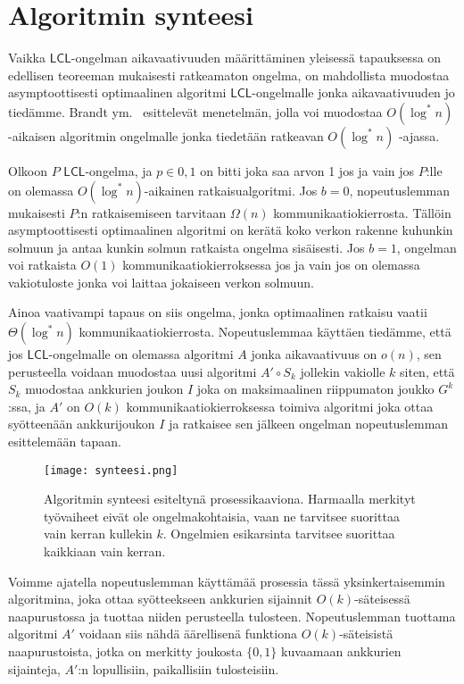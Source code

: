 \documentclass[12pt,finnish]{tktltiki2}
\theoremstyle{definition}
\theoremstyle{remark}
\newcommand*{\lcl}{\ensuremath{\mathsf{LCL}}}
\begin{document}
\section{Algoritmin synteesi}
Vaikka \lcl -ongelman aikavaativuuden määrittäminen yleisessä tapauksessa on edellisen teoreeman mukaisesti ratkeamaton ongelma, on mahdollista muodostaa asymptoottisesti optimaalinen algoritmi \lcl -ongelmalle jonka aikavaativuuden jo tiedämme. Brandt ym.~\cite{brandt} esittelevät menetelmän, jolla voi muodostaa $O(\log^* n)$ -aikaisen algoritmin ongelmalle jonka tiedetään ratkeavan $O(\log^* n)$ -ajassa.

Olkoon $P$ \lcl -ongelma, ja $p \in {0, 1}$ on bitti joka saa arvon 1 jos ja vain jos $P$:lle on olemassa $O(\log^* n)$-aikainen ratkaisualgoritmi. Jos $b = 0$, nopeutuslemman mukaisesti $P$:n ratkaisemiseen tarvitaan $\Omega(n)$ kommunikaatiokierrosta. Tällöin asymptoottisesti optimaalinen algoritmi on kerätä koko verkon rakenne kuhunkin solmuun ja antaa kunkin solmun ratkaista ongelma sisäisesti. Jos $b = 1$, ongelman voi ratkaista $O(1)$ kommunikaatiokierroksessa jos ja vain jos on olemassa vakiotuloste jonka voi laittaa jokaiseen verkon solmuun.

Ainoa vaativampi tapaus on siis ongelma, jonka optimaalinen ratkaisu vaatii $\Theta(\log^* n)$ kommunikaatiokierrosta. Nopeutuslemmaa käyttäen tiedämme, että jos \lcl -ongelmalle on olemassa algoritmi $A$ jonka aikavaativuus on $o(n)$, sen perusteella voidaan muodostaa uusi algoritmi $A' \circ S_k$ jollekin vakiolle $k$ siten, että $S_k$ muodostaa ankkurien joukon $I$ joka on maksimaalinen riippumaton joukko $G^k$:ssa, ja $A'$ on $O(k)$ kommunikaatiokierroksessa toimiva algoritmi joka ottaa syötteenään ankkurijoukon $I$ ja ratkaisee sen jälkeen ongelman nopeutuslemman esittelemään tapaan.


\begin{figure}
  \texttt{[image: synteesi.png]}
  \caption{Algoritmin synteesi esiteltynä prosessikaaviona. Harmaalla merkityt työvaiheet eivät ole ongelmakohtaisia, vaan ne tarvitsee suorittaa vain kerran kullekin $k$. Ongelmien esikarsinta tarvitsee suorittaa kaikkiaan vain kerran.}
\end{figure}

Voimme ajatella nopeutuslemman käyttämää prosessia tässä yksinkertaisemmin algoritmina, joka ottaa syötteekseen ankkurien sijainnit $O(k)$-säteisessä naapurustossa ja tuottaa niiden perusteella tulosteen. Nopeutuslemman tuottama algoritmi $A'$ voidaan siis nähdä äärellisenä funktiona $O(k)$-säteisistä naapurustoista, jotka on merkitty joukosta $\{0, 1\}$ kuvaamaan ankkurien sijainteja, $A'$:n lopullisiin, paikallisiin tulosteisiin.
\end{document}
